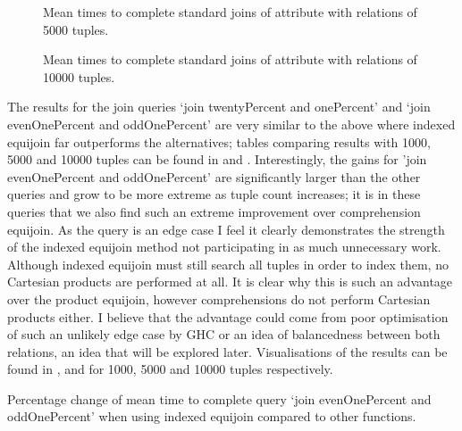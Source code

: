 \begin{figure}[p]
    \centering
    
    \caption{Mean times to complete standard joins of
     attribute with relations of 5000 tuples.}
    \label{fig:benchmark:onePercent-5000}
\end{figure}

\begin{figure}[p]
    \centering
    
    \caption{Mean times to complete standard joins of
     attribute with relations of 10000 tuples.}
    \label{fig:benchmark:onePercent-10000}
\end{figure}

The results for the join queries `join twentyPercent and onePercent' and `join
evenOnePercent and oddOnePercent' are very similar to the above
where indexed equijoin far outperforms the alternatives; tables comparing
results with 1000, 5000 and 10000 tuples can be found in
 and
. Interestingly,
the gains for 'join evenOnePercent and oddOnePercent' are significantly larger
than the other queries and grow to be more extreme as tuple count increases; it
is in these queries that we also find such an extreme improvement over
comprehension equijoin. As the query is an edge case I feel it clearly
demonstrates the strength of the indexed equijoin method not participating in as
much unnecessary work. Although indexed equijoin must still search all tuples in
order to index them, no Cartesian products are performed at all. It is clear why
this is such an advantage over the product equijoin, however comprehensions do
not perform Cartesian products either. I believe that the advantage could come
from poor optimisation of such an unlikely edge case by GHC or an idea of
balancedness between both relations, an idea that will be explored later.
Visualisations of the results can be found in
,  and
 for 1000, 5000 and 10000 tuples respectively.

\begin{table}[b]
    \centering
    
    \caption{Percentage change of mean time to complete query `join evenOnePercent and oddOnePercent' when using indexed equijoin compared to other functions.}
    \label{tab:percentage-change-of-means-join-evenOnePercent-and-oddOnePercent}
\end{table}

